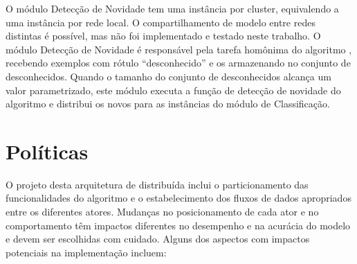 O módulo Detecção de Novidade tem uma instância por cluster, equivalendo a uma
instância por rede local.
O compartilhamento de modelo entre redes distintas é possível, mas não foi
implementado e testado neste trabalho.
% 
O módulo Detecção de Novidade é responsável pela tarefa homônima do algoritmo
\minas, recebendo exemplos com rótulo ``desconhecido'' e os armazenando no
conjunto de desconhecidos.
Quando o tamanho do conjunto de desconhecidos alcança um valor parametrizado,
este módulo executa a função de detecção de novidade do algoritmo \minas
e distribui os novos \mclusters para as instâncias do módulo de Classificação.

\section{Políticas}\label{sec:polices}

O projeto desta arquitetura de \nd distribuída inclui o particionamento das
funcionalidades do algoritmo \minas e o estabelecimento dos fluxos de dados apropriados
entre os diferentes atores.
Mudanças no posicionamento de cada ator e no comportamento têm impactos
diferentes no desempenho e na acurácia do modelo e devem ser escolhidas com
cuidado.
% 
Alguns dos aspectos com impactos potenciais na implementação incluem:

